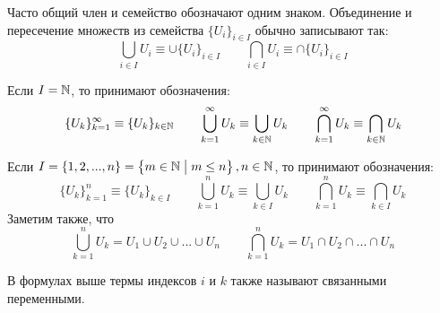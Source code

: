 Часто общий член и семейство обозначают одним знаком.
Объединение и пересечение множеств из семейства $\{U_{i}\}_{i\in I}$
обычно записывают так:
\[
	\bigcup_{i\in I}U_{i}\equiv\cup \{U_{i}\}_{i\in I}\qquad
	\bigcap_{i\in I}U_{i}\equiv\cap \{U_{i}\}_{i\in I}
\]

Если $I=\mathbb N$, то принимают обозначения:
\[
	\{U_{k}\}_{k=1}^{\infty}\equiv\{U_{k}\}_{k\in\mathbb N}\qquad
	\bigcup_{k=1}^{\infty}U_{k}\equiv\bigcup_{k\in\mathbb N}U_{k}\qquad
	\bigcap_{k=1}^{\infty}U_{k}\equiv\bigcap_{k\in\mathbb N}U_{k}
\]

Если $I=\{1,2,...,n\}=\left\{m\in\mathbb N\;\big|\;m\leq n\right\},n\in\mathbb N$,
то принимают обозначения:
\[
	\{U_{k}\}_{k=1}^{n}\equiv\{U_{k}\}_{k\in I}\qquad
	\bigcup_{k=1}^{n}U_{k}\equiv\bigcup_{k\in I}U_{k}\qquad
	\bigcap_{k=1}^{n}U_{k}\equiv\bigcap_{k\in I}U_{k}
\]
Заметим также, что
\[
	\bigcup_{k=1}^{n}U_{k}=U_1\cup U_2\cup ...\cup U_{n}\qquad
	\bigcap_{k=1}^{n}U_{k}=U_1\cap U_2\cap ...\cap U_{n}
\]

В формулах выше термы индексов $i$ и $k$ также называют связанными переменными.


